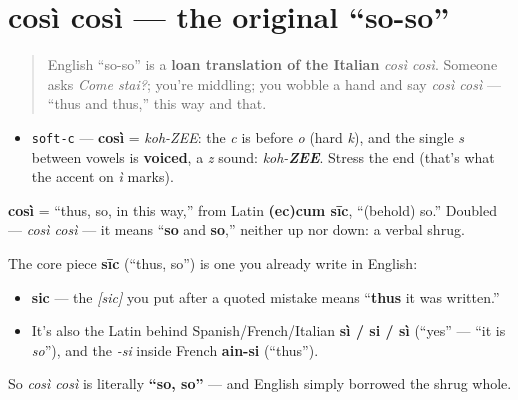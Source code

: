 \section[così così]{così così — the original \textquotedblleft{}so-so\textquotedblright{}}

\label{lesson:IT-C02-cosi-cosi}



\begin{quote}
English \textquotedblleft{}so-so\textquotedblright{} is a \textbf{loan translation of the Italian} \emph{così così}. Someone asks \emph{Come stai?}; you're middling; you wobble a hand and say \emph{così così} — \textquotedblleft{}thus and thus,\textquotedblright{} this way and that.
\end{quote}

\begin{sounds}
\begin{itemize}
\raggedright
  \item \texttt{soft-c} — \textbf{così} = \emph{koh-ZEE}: the \emph{c} is before \emph{o} (hard \emph{k}), and the single \emph{s} between vowels is \textbf{voiced}, a \emph{z} sound: \emph{koh-\textbf{ZEE}}. Stress the end (that's what the accent on \emph{ì} marks).
\end{itemize}
\end{sounds}

\begin{cousinweb}
\textbf{così} = \textquotedblleft{}thus, so, in this way,\textquotedblright{} from Latin \textbf{(ec)cum sīc}, \textquotedblleft{}(behold) so.\textquotedblright{} Doubled — \emph{così così} — it means \textquotedblleft{}\textbf{so} and \textbf{so},\textquotedblright{} neither up nor down: a verbal shrug.

The core piece \textbf{sīc} (\textquotedblleft{}thus, so\textquotedblright{}) is one you already write in English:

\begin{itemize}
\raggedright
  \item \textbf{sic} — the \emph{{[}sic{]}} you put after a quoted mistake means \textquotedblleft{}\textbf{thus} it was written.\textquotedblright{}
  \item It's also the Latin behind Spanish/French/Italian \textbf{sì / si / sì} (\textquotedblleft{}yes\textquotedblright{} — \textquotedblleft{}it is \emph{so}\textquotedblright{}), and the \emph{-si} inside French \textbf{ain-si} (\textquotedblleft{}thus\textquotedblright{}).
\end{itemize}

So \emph{così così} is literally \textbf{\textquotedblleft{}so, so\textquotedblright{}} — and English simply borrowed the shrug whole.
\end{cousinweb}

